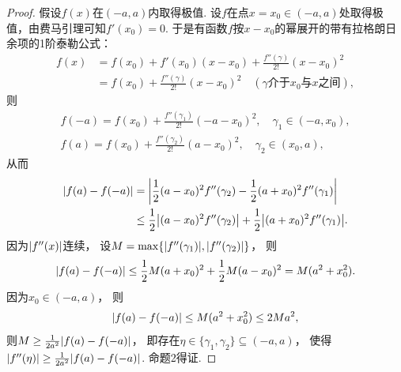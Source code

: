 \begin{example}
\begin{proof}
假设\(f(x)\)在\((-a,a)\)内取得极值.
设\(f\)在点\(x=x_0\in(-a,a)\)处取得极值，由费马引理可知\(f'(x_0)=0\).
于是有函数\(f\)按\(x-x_0\)的幂展开的带有拉格朗日余项的1阶泰勒公式：
\begin{align*}
	f(x) &= f(x_0) + f'(x_0) (x-x_0) + \frac{f''(\gamma)}{2!} (x-x_0)^2 \\
	&= f(x_0) + \frac{f''(\gamma)}{2!} (x-x_0)^2
	\quad(\text{\(\gamma\)介于\(x_0\)与\(x\)之间}),
\end{align*}
则\begin{gather*}
	f(-a) = f(x_0) + \frac{f''(\gamma_1)}{2!}(-a-x_0)^2,
	\quad\gamma_1\in(-a,x_0), \\
	f(a) = f(x_0) + \frac{f''(\gamma_2)}{2!} (a-x_0)^2,
	\quad\gamma_2\in(x_0,a),
\end{gather*}
从而
\begin{align*}
	\abs{f(a)-f(-a)}
	&= \abs{\frac{1}{2} (a-x_0)^2 f''(\gamma_2) - \frac{1}{2} (a+x_0)^2 f''(\gamma_1)} \\
	&\leq \frac{1}{2} \abs{(a-x_0)^2 f''(\gamma_2)} + \frac{1}{2} \abs{(a+x_0)^2 f''(\gamma_1)}.
\end{align*}
因为\(\abs{f''(x)}\)连续，
设\(M = \max\{ \abs{f''(\gamma_1)}, \abs{f''(\gamma_2)} \}\)，
则\begin{equation*}
	\abs{f(a) - f(-a)}
	\leq \frac{1}{2} M(a+x_0)^2 + \frac{1}{2} M(a-x_0)^2
	= M(a^2 + x_0^2).
\end{equation*}
因为\(x_0\in(-a,a)\)，
则\begin{equation*}
	\abs{f(a) - f(-a)} \leq M(a^2+x_0^2) \leq 2 M a^2,
\end{equation*}
则\(M \geq \frac{1}{2 a^2} \abs{f(a) - f(-a)}\)，
即存在\(\eta\in\{\gamma_1,\gamma_2\}\subseteq(-a,a)\)，
使得\(\abs{f''(\eta)} \geq \frac{1}{2 a^2} \abs{f(a) - f(-a)}\).
命题2得证.
\end{proof}
\end{example}


